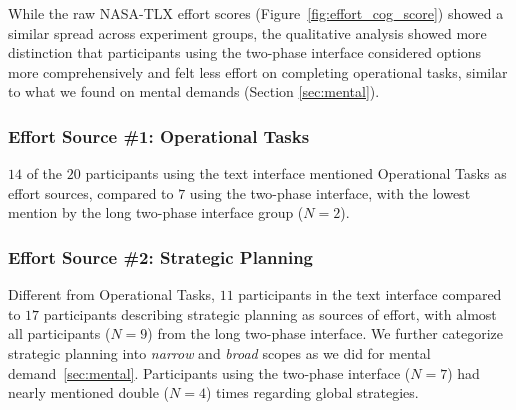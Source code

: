 While the raw NASA-TLX effort scores (Figure~\ref{fig:effort_cog_score}) showed a similar spread across experiment groups, the qualitative analysis showed more distinction that participants using the two-phase interface considered options more comprehensively and felt less effort on completing operational tasks, similar to what we found on mental demands (Section \ref{sec:mental}). 


\subsubsection{Effort Source \#1: Operational Tasks} $14$ of the $20$ participants using the text interface mentioned Operational Tasks as effort sources, compared to $7$ using the two-phase interface, with the lowest mention by the long two-phase interface group ($N=2$). 

\subsubsection{Effort Source \#2: Strategic Planning} Different from Operational Tasks, $11$ participants in the text interface compared to $17$ participants describing strategic planning as sources of effort, with almost all participants ($N=9$) from the long two-phase interface. We further categorize strategic planning into \textit{narrow} and \textit{broad} scopes as we did for mental demand~\cref{sec:mental}. Participants using the two-phase interface ($N=7$) had nearly mentioned double ($N=4$) times regarding global strategies. 




